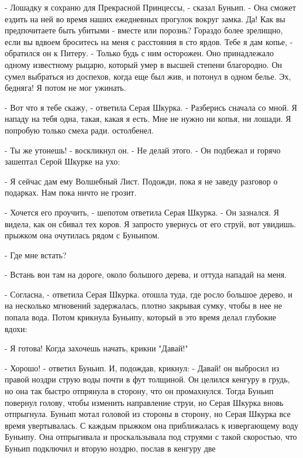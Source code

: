 \par- Лошадку я сохраню для Прекрасной Принцессы, - сказал Буньип. - 
Она сможет ездить на ней во время наших ежедневных прогулок вокруг 
замка. Да! Как вы предпочитаете быть убитыми - вместе или порознь? 
Гораздо более зрелищно, если вы вдвоем броситесь на меня с расстояния 
в сто ярдов. Тебе я дам копье, - обратился он к Питеру. - Только будь 
с ним осторожен. Оно принадлежало одному известному рыцарю, который 
умер в высшей степени благородно. Он сумел выбраться из доспехов, 
когда еще был жив, и потонул в одном белье. Эх, бедняга! Я потом не 
мог ужинать.
\par- Вот что я тебе скажу, - ответила Серая Шкурка. - Разберись 
сначала со мной. Я нападу на тебя одна, такая, какая я есть. Мне не 
нужно ни копья, ни лошади. Я попробую только смеха ради.
 остолбенел.
\par- Ты же утонешь! - воскликнул он. - Не делай этого. - Он подбежал 
и горячо зашептал Серой Шкурке на ухо:
\par- Я сейчас дам ему Волшебный Лист. Подожди, пока я не заведу 
разговор о подарках. Нам пока ничто не грозит.
\par- Хочется его проучить, - шепотом ответила Серая Шкурка. - Он 
зазнался. Я видела, как он сбивал тех коров. Я запросто увернусь от 
его струй, вот увидишь.
 прыжком она очутилась рядом с Буньипом.
\par- Где мне встать?
\par- Встань вон там на дороге, около большого дерева, и оттуда 
нападай на меня.
\par- Согласна, - ответила Серая Шкурка.
 отошла туда, где росло большое дерево, и на несколько 
мгновений задержалась, плотно закрывая сумку, чтобы в нее не попала 
вода. Потом крикнула Буньипу, который в это время делал глубокие 
вдохи:
\par- Я готова! Когда захочешь начать, крикни "Давай!"
\par- Хорошо! - ответил Буньип. И, подождав, крикнул: - Давай!
 он выбросил из правой ноздри струю воды почти в фут 
толщиной. Он целился кенгуру в грудь, но она так быстро отпрянула в 
сторону, что он промахнулся. Тогда Буньип повернул голову, чтобы 
изменить направление струи, но Серая Шкурка вновь отпрыгнула. Буньип 
мотал головой из стороны в сторону, но Серая Шкурка все время 
увертывалась. С каждым прыжком она приближалась к извергающему воду 
Буньипу. Она отпрыгивала и проскальзывала под струями с такой 
скоростью, что Буньип подключил и вторую ноздрю, послав в кенгуру две 
